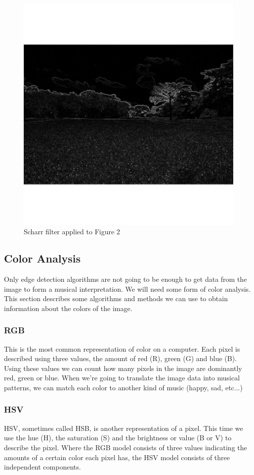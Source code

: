 \documentclass[12pt]{article}
\begin{document}
\begin{figure}[h]
\centering
\includegraphics[scale = 0.45]{img/landscape_Scharr}
\caption{Scharr filter applied to Figure 2}
\end{figure}

\subsection{Color Analysis}
Only edge detection algorithms are not going to be enough to get data from the image to form a musical interpretation. We will need some form of color analysis. This section describes some algorithms and methods we can use to obtain information about the colors of the image.

\subsubsection{RGB}
This is the most common representation of color on a computer. Each pixel is described using three values, the amount of red (R), green (G) and blue (B). Using these values we can count how many pixels in the image are dominantly red, green or blue. When we're going to translate the image data into musical patterns, we can match each color to another kind of music (happy, sad, etc...)
 
\subsubsection{HSV}
HSV, sometimes called HSB, is another representation of a pixel. This time we use the hue (H), the saturation (S) and the brightness or value (B or V) to describe the pixel. Where the RGB model consists of three values indicating the amounts of a certain color each pixel has, the HSV model consists of three independent components. 
\newline
\end{document}
